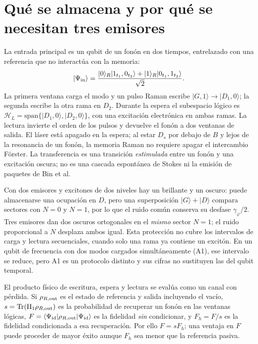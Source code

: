\documentclass[11pt,a4paper]{article}
\newcommand{\ket}[1]{|#1\rangle}
\newcommand{\bra}[1]{\langle #1|}
\newcommand{\gphi}{\gamma_\varphi}
\begin{document}
\section{Qué se almacena y por qué se necesitan tres emisores}\label{sec:protocolo}
La entrada principal es un qubit de un fonón en dos tiempos, entrelazado con una referencia que no
interactúa con la memoria:
\begin{equation}
\ket{\Psi_{\rm in}}=\frac{\ket{0}_R\ket{1_{t_1},0_{t_2}}+\ket{1}_R\ket{0_{t_1},1_{t_2}}}{\sqrt2}.
\end{equation}
La primera ventana carga el modo y un pulso Raman escribe $\ket{G,1}\to\ket{D_1,0}$; la segunda
escribe la otra rama en $D_2$. Durante la espera el subespacio lógico es
$\mathcal H_L=\mathrm{span}\{\ket{D_1,0},\ket{D_2,0}\}$, con una excitación electrónica en ambas ramas.
La lectura invierte el orden de los pulsos y devuelve el fonón a dos ventanas de salida. El láser
está apagado en la espera; al estar $D_s$ por debajo de $B$ y lejos de la resonancia de un fonón,
la memoria Raman no requiere apagar el intercambio Förster. La transferencia es una transición
\emph{estimulada} entre un fonón y una excitación oscura; no es una cascada espontánea de Stokes
ni la emisión de paquetes de Bin et al.

Con dos emisores y excitones de dos niveles hay un brillante y un oscuro: puede almacenarse una
ocupación en $D$, pero una superposición $\ket G+\ket D$ compara sectores con $N=0$ y $N=1$,
por lo que el ruido común conserva su desfase $\gphi/2$. Tres emisores dan dos oscuros ortogonales
en el \emph{mismo} sector $N=1$; el ruido proporcional a $N$ desplaza ambos igual. Esta protección
no cubre los intervalos de carga y lectura secuenciales, cuando solo una rama ya contiene un excitón.
En un qubit de frecuencia con dos modos cargados simultáneamente (A1), ese intervalo se reduce,
pero A1 es un protocolo distinto y sus cifras no sustituyen las del qubit temporal.

El producto físico de escritura, espera y lectura se evalúa como un canal con pérdida. Si $\rho_{R,\rm out}$
es el estado de referencia y salida incluyendo el vacío, $s=\mathrm{Tr}(\Pi_{1}\rho_{R,\rm out})$
es la probabilidad de recuperar un fonón en las ventanas lógicas, $F=\bra{\Psi_{\rm id}}
\rho_{R,\rm out}\ket{\Psi_{\rm id}}$ es la fidelidad \emph{sin} condicionar, y
$F_h=F/s$ es la fidelidad condicionada a esa recuperación. Por ello $F=sF_h$; una ventaja en
$F$ puede proceder de mayor éxito aunque $F_h$ sea menor que la referencia pasiva.
\end{document}
